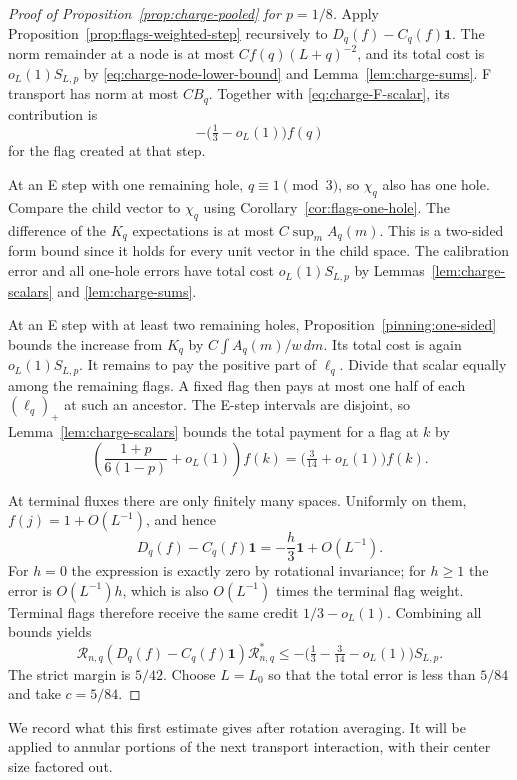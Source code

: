 \begin{proof}[Proof of Proposition~\ref{prop:charge-pooled} for $p=1/8$]
Apply Proposition~\ref{prop:flags-weighted-step} recursively to
$D_q(f)-C_q(f)\mathbf1$.  The norm remainder at a node is at most
$C f(q)(L+q)^{-2}$, and its total cost is $o_L(1)S_{L,p}$ by
\eqref{eq:charge-node-lower-bound} and
Lemma~\ref{lem:charge-sums}.  F transport has norm at most $CB_q$.
Together with \eqref{eq:charge-F-scalar}, its contribution is
\[
 -\bigl(\tfrac13-o_L(1)\bigr)f(q)
\]
for the flag created at that step.

At an E step with one remaining hole, $q\equiv1\pmod3$, so $\chi_q$
also has one hole.  Compare the child vector to $\chi_q$ using Corollary~\ref{cor:flags-one-hole}.
The difference of the $K_q$ expectations is at most
$C\sup_m A_q(m)$.  This is a two-sided form bound since it holds
for every unit vector in the child space.  The calibration error
and all one-hole errors have total cost $o_L(1)S_{L,p}$ by
Lemmas~\ref{lem:charge-scalars} and \ref{lem:charge-sums}.

At an E step with at least two remaining holes, Proposition~\ref{pinning:one-sided}
bounds the increase from $K_q$ by
$C\int A_q(m)/w\,dm$.  Its total cost is again $o_L(1)S_{L,p}$.
It remains to pay the positive part of $\ell_q$.
Divide that scalar equally among the remaining flags.  A fixed flag
then pays at most one half of each $(\ell_q)_+$ at such an ancestor.
The E-step intervals are disjoint, so
Lemma~\ref{lem:charge-scalars} bounds the total payment for a flag at
$k$ by
\[
 \left(\frac{1+p}{6(1-p)}+o_L(1)\right)f(k)
 =\bigl(\tfrac3{14}+o_L(1)\bigr)f(k).
\]

At terminal fluxes there are only finitely many spaces.  Uniformly
on them, $f(j)=1+O(L^{-1})$, and hence
\[
 D_q(f)-C_q(f)\mathbf1=-\frac h3\mathbf1+O(L^{-1}).
\]
For $h=0$ the expression is exactly zero by rotational invariance;
for $h\ge1$ the error is $O(L^{-1})h$, which is also
$O(L^{-1})$ times the terminal flag weight.  Terminal flags
therefore receive the same credit $1/3-o_L(1)$.
Combining all bounds yields
\[
 \mathcal R_{n,q}(D_q(f)-C_q(f)\mathbf1)\mathcal R_{n,q}^*
 \le-\bigl(\tfrac13-\tfrac3{14}-o_L(1)\bigr)S_{L,p}.
\]
The strict margin is $5/42$.  Choose $L=L_0$ so that the total error
is less than $5/84$ and take $c=5/84$.
\end{proof}

We record what this first estimate gives after rotation averaging.
It will be applied to annular portions of the next transport
interaction, with their center size factored out.

